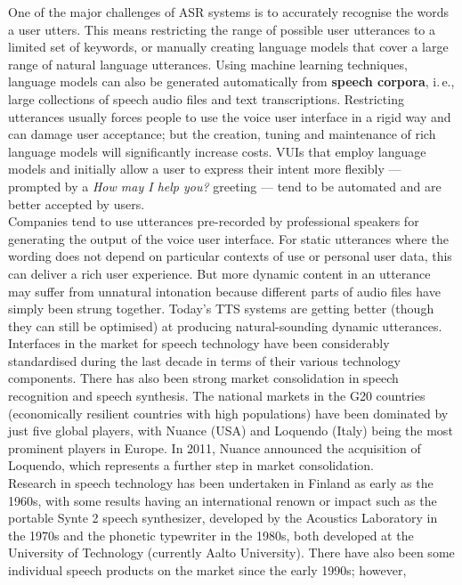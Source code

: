 \begin{multicols}{2}
One of the major challenges of ASR systems is to accurately recognise the words
a user utters. This means restricting the range of possible user utterances to
a limited set of keywords, or manually creating language models that cover a
large range of natural language utterances. Using machine learning techniques,
language models can also be generated automatically from \textbf{speech corpora}, i.\,e.,
large collections of speech audio files and text transcriptions. Restricting
utterances usually forces people to use the voice user interface in a rigid way
and can damage user acceptance; but the creation, tuning and maintenance of
rich language models will significantly increase costs. VUIs that employ
language models and initially allow a user to express their intent more
flexibly — prompted by a \textit{How may I help you?} greeting — tend to be automated
and are better accepted by users.\\
Companies tend to use utterances pre-recorded by professional speakers for
generating the output of the voice user interface. For static utterances where
the wording does not depend on particular contexts of use or personal user
data, this can deliver a rich user experience. But more dynamic content in an
utterance may suffer from unnatural intonation because different parts of audio files have
simply been strung together. Today’s TTS systems are getting better (though
they can still be optimised) at producing natural-sounding dynamic utterances.\\
Interfaces in the market for speech technology 
have been considerably standardised during the last decade in terms of their various
technology components. There has also been strong market consolidation in
speech recognition and speech synthesis. The national markets in the G20
countries (economically resilient countries with high populations) have been
dominated by just five global players, with Nuance (USA) and Loquendo (Italy)
being the most prominent players in Europe. In 2011, Nuance announced the
acquisition of Loquendo, which represents a further step in market
consolidation.\\
Research in speech technology has been undertaken in Finland as early as the
1960s, with some results having an international renown or impact such as the
portable Synte 2 speech synthesizer, developed by the Acoustics Laboratory in
the 1970s and the phonetic typewriter in the 1980s, both developed at the
University of Technology (currently Aalto University). There have also been
some individual speech products on the market since the early 1990s; however,

\end{multicols}
